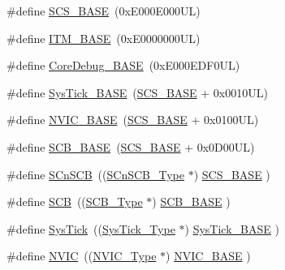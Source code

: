 \begin{DoxyCompactItemize}
\item 
\#define \hyperlink{group___c_m_s_i_s__core__register_ga3c14ed93192c8d9143322bbf77ebf770}{S\+C\+S\+\_\+\+B\+A\+SE}~(0x\+E000\+E000\+U\+L)
\item 
\#define \hyperlink{group___c_m_s_i_s__core__register_gadd76251e412a195ec0a8f47227a8359e}{I\+T\+M\+\_\+\+B\+A\+SE}~(0x\+E0000000\+U\+L)
\item 
\#define \hyperlink{group___c_m_s_i_s__core__register_ga680604dbcda9e9b31a1639fcffe5230b}{Core\+Debug\+\_\+\+B\+A\+SE}~(0x\+E000\+E\+D\+F0\+U\+L)
\item 
\#define \hyperlink{group___c_m_s_i_s__core__register_ga58effaac0b93006b756d33209e814646}{Sys\+Tick\+\_\+\+B\+A\+SE}~(\hyperlink{group___c_m_s_i_s__core__register_ga3c14ed93192c8d9143322bbf77ebf770}{S\+C\+S\+\_\+\+B\+A\+SE} +  0x0010\+U\+L)
\item 
\#define \hyperlink{group___c_m_s_i_s__core__register_gaa0288691785a5f868238e0468b39523d}{N\+V\+I\+C\+\_\+\+B\+A\+SE}~(\hyperlink{group___c_m_s_i_s__core__register_ga3c14ed93192c8d9143322bbf77ebf770}{S\+C\+S\+\_\+\+B\+A\+SE} +  0x0100\+U\+L)
\item 
\#define \hyperlink{group___c_m_s_i_s__core__register_gad55a7ddb8d4b2398b0c1cfec76c0d9fd}{S\+C\+B\+\_\+\+B\+A\+SE}~(\hyperlink{group___c_m_s_i_s__core__register_ga3c14ed93192c8d9143322bbf77ebf770}{S\+C\+S\+\_\+\+B\+A\+SE} +  0x0\+D00\+U\+L)
\item 
\#define \hyperlink{group___c_m_s_i_s__core__register_ga9fe0cd2eef83a8adad94490d9ecca63f}{S\+Cn\+S\+CB}~((\hyperlink{struct_s_cn_s_c_b___type}{S\+Cn\+S\+C\+B\+\_\+\+Type}    $\ast$)     \hyperlink{group___c_m_s_i_s__core__register_ga3c14ed93192c8d9143322bbf77ebf770}{S\+C\+S\+\_\+\+B\+A\+SE}      )
\item 
\#define \hyperlink{group___c_m_s_i_s__core__register_gaaaf6477c2bde2f00f99e3c2fd1060b01}{S\+CB}~((\hyperlink{struct_s_c_b___type}{S\+C\+B\+\_\+\+Type}       $\ast$)     \hyperlink{group___c_m_s_i_s__core__register_gad55a7ddb8d4b2398b0c1cfec76c0d9fd}{S\+C\+B\+\_\+\+B\+A\+SE}      )
\item 
\#define \hyperlink{group___c_m_s_i_s__core__register_gacd96c53beeaff8f603fcda425eb295de}{Sys\+Tick}~((\hyperlink{struct_sys_tick___type}{Sys\+Tick\+\_\+\+Type}   $\ast$)     \hyperlink{group___c_m_s_i_s__core__register_ga58effaac0b93006b756d33209e814646}{Sys\+Tick\+\_\+\+B\+A\+SE}  )
\item 
\#define \hyperlink{group___c_m_s_i_s__core__register_gac8e97e8ce56ae9f57da1363a937f8a17}{N\+V\+IC}~((\hyperlink{struct_n_v_i_c___type}{N\+V\+I\+C\+\_\+\+Type}      $\ast$)     \hyperlink{group___c_m_s_i_s__core__register_gaa0288691785a5f868238e0468b39523d}{N\+V\+I\+C\+\_\+\+B\+A\+SE}     )

\end{DoxyCompactItemize}
